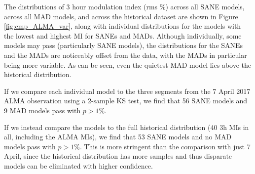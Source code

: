 
The distributions of 3 hour modulation index (rms \%) across all SANE models, across all MAD models, and across the historical dataset are shown in Figure \ref{fig:cmp_ALMA_var}, along with individual distributions for the models with the lowest and highest MI for SANEs and MADs. Although individually, some models may pass (particularly SANE models), the distributions for the SANEs and the MADs are noticeably offset from the data, with the MADs in particular being more variable. As can be seen, even the quietest MAD model lies above the historical distribution. 

If we compare each individual model to the three segments from the 7 April 2017 ALMA observation using a 2-sample KS test, we find that 56 SANE models and 9 MAD models pass with $p > 1\%$. 

If we instead compare the models to the full historical distribution (40 3h MIs in all, including the ALMA MIs), we find that 53 SANE models and no MAD models pass with $p > 1\%$. This is more stringent than the comparison with just 7 April, since the historical distribution has more samples and thus disparate models can be eliminated with higher confidence. 


